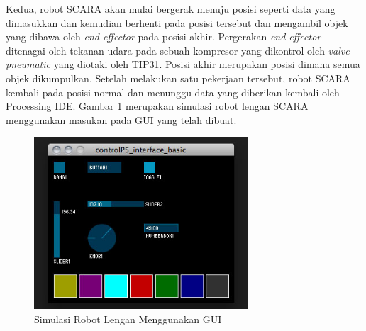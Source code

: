 Kedua, robot SCARA akan mulai bergerak menuju posisi seperti data yang dimasukkan dan kemudian berhenti pada posisi tersebut dan mengambil objek yang dibawa oleh \textit{end-effector} pada posisi akhir.  Pergerakan \textit{end-effector} ditenagai oleh tekanan udara pada sebuah kompresor yang dikontrol oleh\textit{ valve pneumatic} yang diotaki oleh TIP31. Posisi akhir merupakan posisi dimana semua objek dikumpulkan. Setelah melakukan satu pekerjaan tersebut, robot SCARA kembali pada posisi normal dan menunggu data yang diberikan kembali oleh Processing IDE.  Gambar \ref{pic.simulasiakhir} merupakan simulasi robot lengan SCARA menggunakan masukan pada GUI yang telah dibuat.
 \begin{figure}[H]
 	\centering
 	\includegraphics[width=8cm]{gambar/controlp5.jpg}
 	\caption{Simulasi Robot Lengan Menggunakan GUI }
 	\label{pic.simulasiakhir}
 \end{figure}




